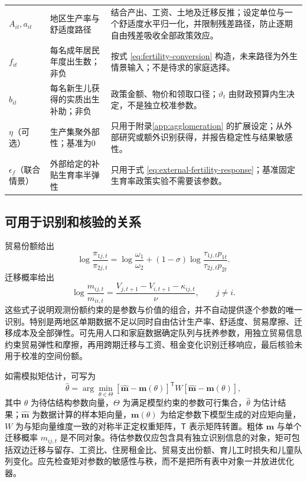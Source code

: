 \documentclass[UTF8,a4paper,zihao=-4,fontset=windows]{ctexart}
\numberwithin{equation}{section}
\begin{document}
\begin{longtable}{L{0.17\textwidth}L{0.35\textwidth}L{0.38\textwidth}}
$A_{it},a_{it}$ & 地区生产率与舒适度路径 & 结合产出、工资、土地及迁移反推；设定单位与一个舒适度水平归一化，并限制残差路径，防止逐期自由残差吸收全部政策效应。\\
$f_{it}$ & 每名成年居民年度出生数；非负 & 按式 \eqref{eq:fertility-conversion} 构造，未来路径为外生情景输入；不是待求的家庭选择。\\
$b_{it}$ & 每名新生儿获得的实质出生补助；非负 & 政策金额、物价和领取口径；$\vartheta_t$ 由财政预算内生决定，不是独立校准参数。\\
$\eta$（可选） & 生产集聚外部性；基准为0 & 只用于附录\ref{app:agglomeration} 的扩展设定；从外部研究或额外识别获得，并报告稳定性与结果敏感性。\\
$\epsilon_f$（联合情景） & 外部给定的补贴生育率半弹性 & 只用于式 \eqref{eq:external-fertility-response}；基准固定生育率政策实验不需要该参数。\\
\end{longtable}
\normalsize

\subsection{可用于识别和核验的关系}
贸易份额给出
\begin{equation}
  \log\frac{\pi_{1j,t}}{\pi_{2j,t}}
   =\log\frac{\omega_1}{\omega_2}
    +(1-\sigma)\log\frac{\tau_{1j,t}p_{1t}}{\tau_{2j,t}p_{2t}}.
  \label{eq:trade-identification}
\end{equation}
迁移概率给出
\begin{equation}
  \log\frac{m_{ij,t}}{m_{ii,t}}
    =\frac{V_{j,t+1}-V_{i,t+1}-\kappa_{ij,t}}{\nu},
    \qquad j\ne i.
  \label{eq:migration-identification}
\end{equation}
这些式子说明观测份额约束的是参数与价值的组合，并不自动提供逐个参数的唯一识别。特别是两地区单期数据不足以同时自由估计生产率、舒适度、贸易摩擦、迁移成本及全部弹性。可先用人口和家庭数据确定队列与抚养参数，用独立贸易信息约束贸易弹性和摩擦，再用跨期迁移与工资、租金变化识别迁移响应，最后核验未用于校准的空间份额。

如需模拟矩估计，可写为
\begin{equation}
  \widehat\theta=\arg\min_{\theta\in\Theta}
    [\widehat{\bm m}-\bm m(\theta)]^{\mathsf T}
      W[\widehat{\bm m}-\bm m(\theta)],
  \label{eq:smm}
\end{equation}
其中 $\theta$ 为待估结构参数向量，$\Theta$ 为满足模型约束的参数可行集合，$\widehat\theta$ 为估计结果；$\widehat{\bm m}$ 为数据计算的样本矩向量，$\bm m(\theta)$ 为给定参数下模型生成的对应矩向量，$W$ 为与矩向量维度一致的对称半正定权重矩阵，$\mathsf T$ 表示矩阵转置。粗体 $\bm m$ 与单个迁移概率 $m_{ij,t}$ 是不同对象。待估参数仅应包含具有独立识别信息的对象，矩可包括双边迁移与留存、工资比、住房租金比、贸易支出份额、育儿工时损失和儿童队列变化。应先检查矩对参数的敏感性与秩，而不是把所有表中对象一并放进优化器。
\end{document}
